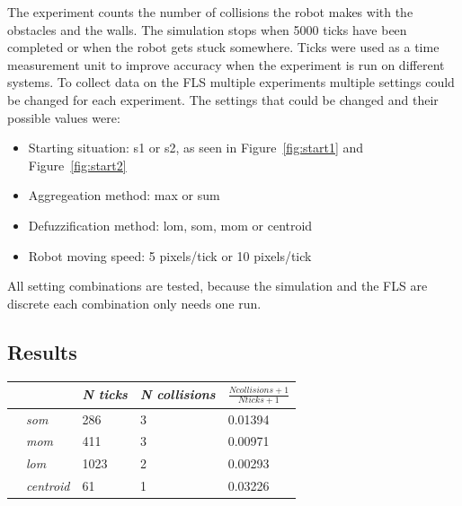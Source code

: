 \documentclass[conference]{IEEEtran}
\begin{document}
The experiment counts the number of collisions the robot makes with the obstacles and the walls. The simulation stops when 5000 ticks have been completed or when the robot gets stuck somewhere. Ticks were used as a time measurement unit to improve accuracy when the experiment is run on different systems. To collect data on the FLS multiple experiments multiple settings could be changed for each experiment. The settings that could be changed and their possible values were:
\begin{itemize}
  \item Starting situation: s1 or s2, as seen in Figure~\ref{fig:start1} and Figure~\ref{fig:start2}
  \item Aggregeation method: max or sum
  \item Defuzzification method: lom, som, mom or centroid
  \item Robot moving speed: 5 pixels/tick or 10 pixels/tick
\end{itemize}

All setting combinations are tested, because the simulation and the FLS are discrete each combination only needs one run.


\subsection{Results}

\begin{center}
\begin{tabular}{ | m{2.8em} | m{3em} | m{2.8em} | m{5em} | m{5.2em} | }
\hline
{} & \textit{N ticks} & \textit{N collisions} & $\frac{N collisions + 1}{N ticks + 1}$ \\
\hline
{} & \textit{som} & 286 & 3 & 0.01394 \\
 & \textit{mom} & 411 & 3 & 0.00971 \\
 & \textit{lom} & 1023 & 2 & 0.00293 \\
 & \textit{centroid} & 61 & 1 & 0.03226 \\
\hline
\end{tabular}
\label{table:ps5e1amax}
\end{center}
\end{document}
